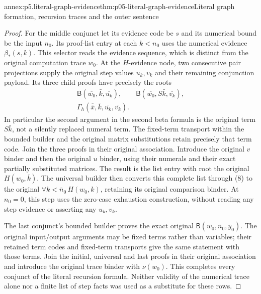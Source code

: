\begin{annexitem}{annex:p5.literal-graph-evidence}{thm:p05-literal-graph-evidence}{Literal graph formation, recursion traces and the outer sentence}
\begin{proof}
For the middle conjunct let its evidence code be \(s\) and its
numerical bound be the input \(n_0\). Its proof-list entry at
each \(k<n_0\) uses the numerical evidence
\(\beta_*(s,k)\). This selector reads the evidence sequence,
which is distinct from the original computation trace \(w_0\).
At the \(H\)-evidence node, two consecutive pair projections
supply the original step values \(u_k,v_k\) and their remaining
conjunction payload. Its three child proofs have precisely the
roots
\[
\begin{gathered}
 \mathsf B(\overline{w_0},\bar k,\overline{u_k}),\qquad
 \mathsf B(\overline{w_0},S\bar k,\overline{v_k}),\\
 \Gamma_h(\overline{\bar x},\bar k,
                              \overline{u_k},\overline{v_k}).
\end{gathered}
\tag{12}
\]
In particular the second argument in the second beta formula is the
original term \(S\bar k\), not a silently replaced numeral term.
The fixed-term transport within the bounded builder and the original
matrix substitutions retain precisely that term code. Join the
three proofs in their original association. Introduce the original
\(v\) binder and then the original \(u\) binder, using their
numerals and their exact partially substituted matrices. The result
is the list entry with root the original \(H(w_0,\bar k)\).
The universal builder then converts this complete list through (8)
to the original \(\forall k<\bar n_0\,H(w_0,k)\), retaining
its original comparison binder. At \(n_0=0\), this step uses
the zero-case exhaustion construction, without reading any step
evidence or asserting any \(u_k,v_k\).

The last conjunct's bounded builder proves the exact original
\(\mathsf B(\overline{w_0},\bar n_0,\bar y_0)\). The
original input/output arguments may be fixed terms rather than
variables; their retained term codes and fixed-term transports give
the same statement with those terms. Join the initial, universal
and last proofs in their original association and introduce the
original trace binder with \(\nu(w_0)\). This completes every
conjunct of the literal recursion formula. Neither validity of the
numerical trace alone nor a finite list of step facts was used as a
substitute for these rows.


\end{proof}
\end{annexitem}
